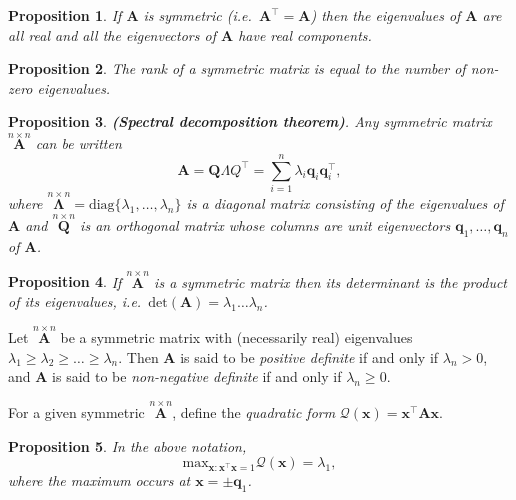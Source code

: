 \documentclass[]{book}
\newtheorem{proposition}{Proposition}[chapter]
\theoremstyle{definition}
\theoremstyle{definition}
\theoremstyle{definition}
\theoremstyle{remark}
\begin{document}
\begin{proposition}
\protect\hypertarget{prp:unnamed-chunk-3}{}{\label{prp:unnamed-chunk-3} }If \(\mathbf A\) is symmetric (i.e.~\({\mathbf A}^\top ={\mathbf A}\)) then the
eigenvalues of \(\mathbf A\) are all \emph{real} and all the eigenvectors of \(\mathbf A\) have
\emph{real} components.
\end{proposition}

\begin{proposition}
\protect\hypertarget{prp:unnamed-chunk-4}{}{\label{prp:unnamed-chunk-4} }The rank of a symmetric matrix is equal to the number of non-zero eigenvalues.
\end{proposition}

\begin{proposition}
\protect\hypertarget{prp:spectraldecomp}{}{\label{prp:spectraldecomp} }\textbf{(Spectral decomposition theorem)}. Any symmetric matrix \(\stackrel{n\times n}{\mathbf A}\) can
be written
\[ {\mathbf A}={\mathbf Q \Lambda Q}^\top = \sum _{i=1}^{n} \lambda _i {\mathbf q}_i {\mathbf q}_i^\top ,\]
where \(\stackrel{n\times n}{\mathbf \Lambda}=\text{diag}\{ \lambda _1, \dots , \lambda _n \}\) is
a diagonal matrix consisting of the eigenvalues of \(\mathbf A\) and \(\stackrel{n\times n}{\mathbf Q}\) is
an orthogonal matrix whose columns are unit eigenvectors
\({\mathbf q}_1, \dots , {\mathbf q}_n\) of \(\mathbf A\).
\end{proposition}

\begin{proposition}
\protect\hypertarget{prp:unnamed-chunk-5}{}{\label{prp:unnamed-chunk-5} }If \(\stackrel{n\times n}{\mathbf A}\) is a symmetric matrix
then its determinant is the product of its eigenvalues, i.e.~\(\text{det}({\mathbf A})=\lambda _1 \dots \lambda _n\).
\end{proposition}

Let \(\stackrel{n\times n}{\mathbf A}\) be a symmetric matrix
with (necessarily real) eigenvalues \(\lambda _1 \geq \lambda _2 \geq \dots \geq \lambda _n\). Then \(\mathbf A\) is said to be \emph{positive definite}
if and only if \(\lambda _n >0\), and \(\boldsymbol A\) is said to be \emph{non-negative definite} if and only if \(\lambda _n\geq 0\).

For a given symmetric \(\stackrel{n\times n}{\mathbf A}\), define the
\emph{quadratic form}
\(\mathcal{Q}({\mathbf x})={\mathbf x}^\top {\mathbf A} {\mathbf x}\).

\begin{proposition}
\protect\hypertarget{prp:two8}{}{\label{prp:two8} }In the above notation,
\[\displaystyle{\text{max}_{{\mathbf x}:{\mathbf x}^\top {\mathbf x}=1}} \mathcal{Q}({\mathbf x})=\lambda_1,\]
where the maximum occurs at \(\boldsymbol x=\pm \boldsymbol q_1\).
\end{proposition}
\end{document}
